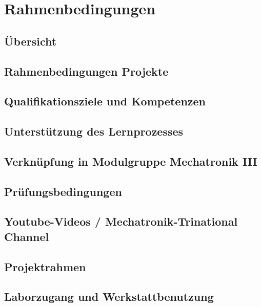 \section*{Rahmenbedingungen}


\subsection{Übersicht}


\subsection{Rahmenbedingungen Projekte}


\subsection{Qualifikationsziele und Kompetenzen}


\subsection{Unterstützung des Lernprozesses}


\subsection{Verknüpfung in Modulgruppe Mechatronik III}


\subsection{Prüfungsbedingungen}


\subsection{Youtube-Videos / Mechatronik-Trinational Channel}


\subsection{Projektrahmen}


\subsection{Laborzugang und Werkstattbenutzung}